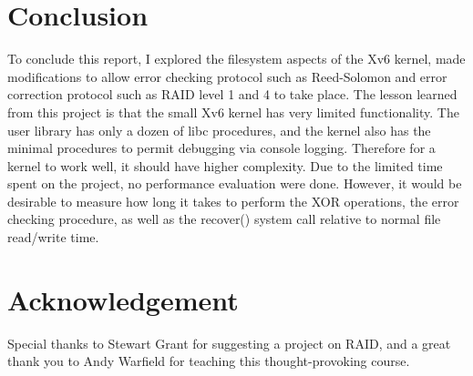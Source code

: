 \section{Conclusion}
To conclude this report, I explored the filesystem aspects of the Xv6 kernel, made modifications to allow error checking protocol such as Reed-Solomon and error correction protocol such as RAID level 1 and 4 to take place. The lesson learned from this project is that the small Xv6 kernel has very limited functionality. The user library has only a dozen of libc procedures, and the kernel also has the minimal procedures to permit debugging via console logging. Therefore for a kernel to work well, it should have higher complexity. Due to the limited time spent on the project, no performance evaluation were done. However, it would be desirable to measure how long it takes to perform the XOR operations, the error checking procedure, as well as the recover() system call relative to normal file read/write time. 

\section{Acknowledgement}

Special thanks to Stewart Grant for suggesting a project on RAID, and a great thank you to Andy Warfield for teaching this thought-provoking course.









